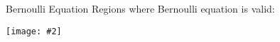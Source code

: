 \documentclass[12pt,aspectratio=169]{beamer}
\newcommand{\pic}[2]{\texttt{[image: \#2]}}
\newcommand{\mb}[1]{\mathbf{#1}}
\newcommand{\eq}[2]{\vspace{#1}{\Large\begin{displaymath}#2\end{displaymath}}}
\begin{document}
%
%    
%
%
%
%
%
%
%



\begin{frame}{Bernoulli Equation}
  Regions where Bernoulli equation is valid:
  \begin{center}
    \pic{.8}{bernoulli.png}
  \end{center}
\end{frame}
\end{document}
